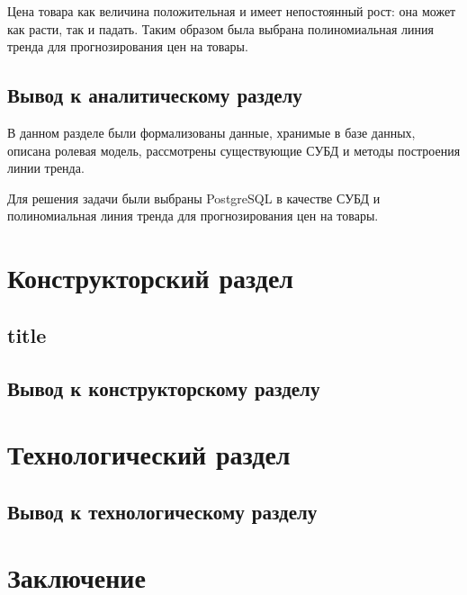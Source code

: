 \documentclass[a4paper,14pt]{extreport}
\begin{document}
Цена товара как величина положительная и имеет непостоянный рост: она может как расти, так и падать. Таким образом была выбрана полиномиальная линия тренда для прогнозирования цен на товары.

\section*{Вывод к аналитическому разделу}

В данном разделе были формализованы данные, хранимые в базе данных, описана ролевая модель, рассмотрены существующие СУБД и методы построения линии тренда.

Для решения задачи были выбраны PostgreSQL в качестве СУБД и полиномиальная линия тренда для прогнозирования цен на товары.

\chapter{Конструкторский раздел}

\section{title}

\section*{Вывод к конструкторскому разделу}

\chapter{Технологический раздел}

\section*{Вывод к технологическому разделу}

\chapter*{Заключение}


\newpage
{}
\renewcommand\bibname{Список литературы}
\end{document}

